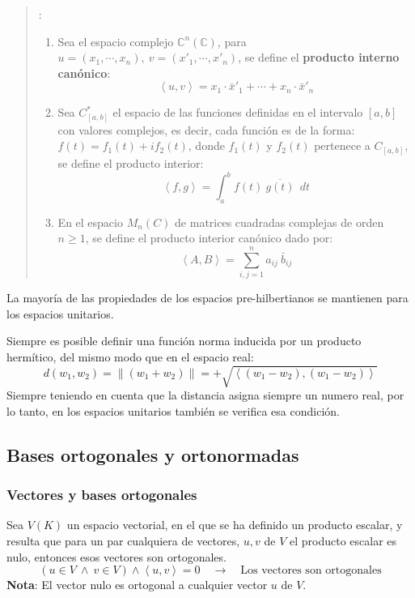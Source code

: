 \begin{quote}
  :
  \begin{enumerate}
    \item Sea el espacio complejo \(\mathbb{C}^n (\mathbb{C})\), para \(u=(x_1, \cdots , x_n), ~ v=(x'_1, \cdots, x'_n)\), se define el \textbf{producto interno canónico}:
    \[
      \left\langle u,v\right\rangle = x_1 \cdot \bar{x}'_1 + \cdots + x_n \cdot \bar{x}'_n
    \]
    \item Sea \(C^*_{[a,b]}\) el espacio de las funciones definidas en el intervalo \([a,b]\) con valores complejos, es decir, cada función es de la forma: \(f(t)=f_1(t)+if_2(t)\), donde \(f_1(t)\) y \(f_2(t)\) pertenece a \(C_{[a,b]}\), se define el producto interior:
    \[
      \left\langle f, g\right\rangle = \int_{a}^{b} f(t) ~\overline{g(t)} ~~ dt 
    \]
    \item En el espacio \(M_n (C)\) de matrices cuadradas complejas de orden \(n\geq 1\), se define el producto interior canónico dado por:
    \[
      \left\langle A,B\right\rangle = \sum_{i,j=1}^{n} a_{ij} ~ \bar{b}_{ij} 
    \]
  \end{enumerate}
\end{quote}
La mayoría de las propiedades de los espacios pre-hilbertianos se mantienen para los espacios unitarios.

Siempre es posible definir una función norma inducida por un producto hermítico, del mismo modo que en el espacio real:
\[
  d(w_1, w_2) = \left\lVert (w_1 + w_2)\right\rVert = + \sqrt{\left\langle (w_1 - w_2), (w_1 - w_2)\right\rangle } 
\]
Siempre teniendo en cuenta que la distancia asigna siempre un numero real, por lo tanto, en los espacios unitarios también se verifica esa condición.

\subsection{Bases ortogonales y ortonormadas}

\subsubsection{Vectores y bases ortogonales}

Sea \(V(K)\) un espacio vectorial, en el que se ha definido un producto escalar, y resulta que para un par cualquiera de vectores, \(u,v\) de \(V\) el producto escalar es nulo, entonces esos vectores son ortogonales.
\[
(u \in V ~ \land ~ v \in V) \land \left\langle u,v\right\rangle = 0 \quad \rightarrow \quad \text{Los vectores son ortogonales}
\]
\textbf{Nota}: El vector nulo es ortogonal a cualquier vector \(u\) de \(V\).

